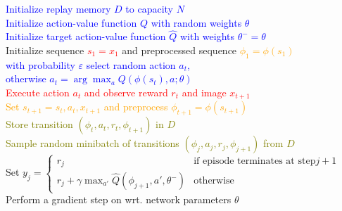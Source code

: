 \documentclass{standalone}
\begin{document}
\pagestyle{empty}
\begin{algorithm}[H]
  \textcolor{blue}{Initialize replay memory $D$ to capacity $N$\\
  Initialize action-value function $Q$ with random weights $\theta$\\
  Initialize target action-value function $\hat{Q}$ with weights $\theta^{-}=\theta$} \\
 {
  Initialize sequence \textcolor{red}{$s_1 = {x_1}$} and preprocessed sequence \textcolor{orange}{$\phi_1=\phi(s_1)$}\\
   {
  \textcolor{blue}{with probability $\varepsilon$ select random action $a_t$, \\
  	otherwise $a_t = \arg\max_{a} Q(\phi(s_t), a; \theta)$} \\
  \textcolor{red}{Execute action $a_t$ and observe reward $r_t$ and image $x_{t+1}$}\\
  \textcolor{orange}{Set $s_{t+1} = s_t, a_t, x_{t+1}$ and preprocess $\phi_{t+1} = \phi(s_{t+1})$}\\
  \textcolor{olive}{Store transition $(\phi_t,a_t ,r_t, \phi_{t+1})$ in $D$\\
  Sample random minibatch of transitions $(\phi_j,a_j ,r_j, \phi_{j+1})$ from $D$}\\
  Set $y_j = \begin{cases}
      r_j & \text{if episode terminates at step} j+1\\
      r_j + \gamma \max_{a'} \hat{Q}(\phi_{j+1}, a', \theta^{-}) & \text{otherwise}
    \end{cases} $ \\
  Perform a gradient step on wrt. network parameters $\theta$\\
  }
}
\end{algorithm}
\end{document}

